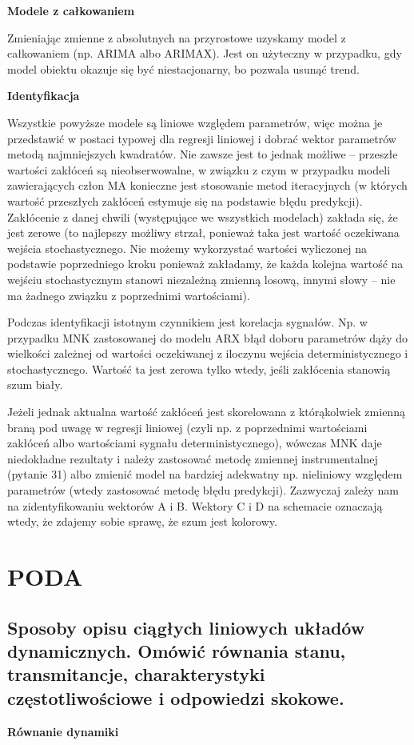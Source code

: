 \textbf{Modele z całkowaniem}

Zmieniając zmienne z absolutnych na przyrostowe uzyskamy model z całkowaniem (np. ARIMA albo ARIMAX). Jest on użyteczny w przypadku, gdy model obiektu okazuje się być niestacjonarny, bo pozwala usunąć trend.

\textbf{Identyfikacja}

Wszystkie powyższe modele są liniowe względem parametrów, więc można je przedstawić w postaci typowej dla regresji liniowej i dobrać wektor parametrów metodą najmniejszych kwadratów. Nie zawsze jest to jednak możliwe – przeszłe wartości zakłóceń są nieobserwowalne, w związku z czym w przypadku modeli zawierających człon MA konieczne jest stosowanie metod iteracyjnych (w których wartość przeszłych zakłóceń estymuje się na podstawie błędu predykcji). Zakłócenie z danej chwili (występujące we wszystkich modelach) zakłada się, że jest zerowe (to najlepszy możliwy strzał, ponieważ taka jest wartość oczekiwana wejścia stochastycznego. Nie możemy wykorzystać wartości wyliczonej na podstawie poprzedniego kroku ponieważ zakładamy, że każda kolejna wartość na wejściu stochastycznym stanowi niezależną zmienną losową, innymi słowy – nie ma żadnego związku z poprzednimi wartościami). 

Podczas identyfikacji istotnym czynnikiem jest korelacja sygnałów. Np. w przypadku MNK zastosowanej do modelu ARX błąd doboru parametrów dąży do wielkości zależnej od wartości oczekiwanej z iloczynu wejścia deterministycznego i stochastycznego. Wartość ta jest zerowa tylko wtedy, jeśli zakłócenia stanowią szum biały.

Jeżeli jednak aktualna wartość zakłóceń jest skorelowana z którąkolwiek zmienną braną pod uwagę w regresji liniowej (czyli np. z poprzednimi wartościami zakłóceń albo wartościami sygnału deterministycznego), wówczas MNK daje niedokładne rezultaty i należy zastosować metodę zmiennej instrumentalnej (pytanie 31) albo zmienić model na bardziej adekwatny np. nieliniowy względem parametrów (wtedy zastosować metodę błędu predykcji). Zazwyczaj zależy nam na zidentyfikowaniu wektorów A i B. Wektory C i D na schemacie oznaczają wtedy, że zdajemy sobie sprawę, że szum jest kolorowy.

\section{PODA}
\subsection{Sposoby opisu ciągłych liniowych układów dynamicznych. Omówić równania stanu, transmitancje, charakterystyki częstotliwościowe i odpowiedzi skokowe.}
\textbf{Równanie dynamiki}

